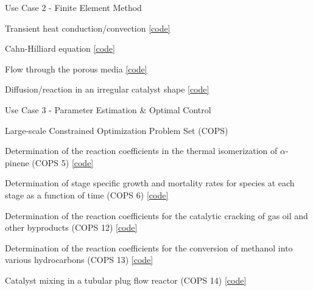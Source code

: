 \documentclass[compress,newPxFont,sthlmFooter]{beamer}
\begin{document}
\begin{frame}[plain]{Use Case 2 - Finite Element Method}
    \begin{itemize}
      {\small
          \item \alert{Transient heat conduction/convection}
                \href{http://daetools.com/docs/tutorials-fe.html\#tutorial-dealii-2}{[code]}
          \item \alert{Cahn-Hilliard equation}
                \href{http://daetools.com/docs/tutorials-fe.html\#tutorial-dealii-3}{[code]}
          \item \alert{Flow through the porous media}
                \href{http://daetools.com/docs/tutorials-fe.html\#tutorial-dealii-5}{[code]}
          \item \alert{Diffusion/reaction in an irregular catalyst shape}
                \href{http://daetools.com/docs/tutorials-fe.html\#tutorial-dealii-6}{[code]}
      }
    \end{itemize}
\end{frame}

\begin{frame}[plain]{Use Case 3 - Parameter Estimation \& Optimal Control}
    \begin{center}
        {\small
            \alert{Large-scale Constrained Optimization Problem Set (COPS)}
        }
    \end{center}  
    \begin{itemize}
      {\small
          \item Determination of the reaction coefficients in the thermal isomerization of $\alpha$-pinene (COPS 5)
                \href{http://daetools.com/docs/tutorials-chemeng-optimisation.html\#tutorial-che-opt-2}{[code]}
          \item Determination of stage specific growth and mortality rates for species at each stage as a function of time (COPS 6)
                \href{http://daetools.com/docs/tutorials-chemeng-optimisation.html\#tutorial-che-opt-3}{[code]}
          \item Determination of the reaction coefficients for the catalytic cracking of gas oil and other byproducts (COPS 12)
                \href{http://daetools.com/docs/tutorials-chemeng-optimisation.html\#tutorial-che-opt-4}{[code]}
          \item Determination of the reaction coefficients for the conversion of methanol into various hydrocarbons (COPS 13)
                \href{http://daetools.com/docs/tutorials-chemeng-optimisation.html\#tutorial-che-opt-5}{[code]}
          \item Catalyst mixing in a tubular plug flow reactor (COPS 14)
                \href{http://daetools.com/docs/tutorials-chemeng-optimisation.html\#tutorial-che-opt-6}{[code]}
      }
    \end{itemize}
\end{frame}
\end{document}
